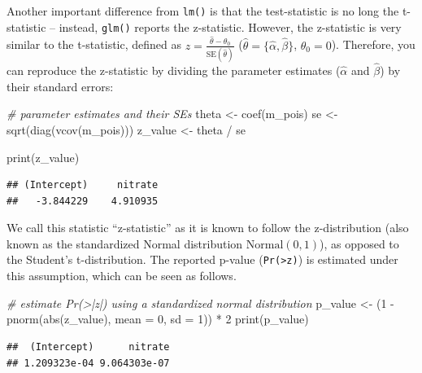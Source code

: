 \documentclass[
]{article}
\newenvironment{Shaded}{\begin{snugshade}}{\end{snugshade}}
\newcommand{\AttributeTok}[1]{\textcolor[rgb]{0.77,0.63,0.00}{#1}}
\newcommand{\CommentTok}[1]{\textcolor[rgb]{0.56,0.35,0.01}{\textit{#1}}}
\newcommand{\DecValTok}[1]{\textcolor[rgb]{0.00,0.00,0.81}{#1}}
\newcommand{\FunctionTok}[1]{\textcolor[rgb]{0.00,0.00,0.00}{#1}}
\newcommand{\NormalTok}[1]{#1}
\newcommand{\OtherTok}[1]{\textcolor[rgb]{0.56,0.35,0.01}{#1}}
\newcommand{\SpecialCharTok}[1]{\textcolor[rgb]{0.00,0.00,0.00}{#1}}
\begin{document}
Another important difference from \texttt{lm()} is that the test-statistic is no long the t-statistic -- instead, \texttt{glm()} reports the z-statistic. However, the z-statistic is very similar to the t-statistic, defined as \(z=\frac{\hat{\theta} - \theta_0}{\text{SE}(\hat{\theta})}\) (\(\hat{\theta} = \{\hat{\alpha}, \hat{\beta}\}\), \(\theta_0 = 0\)). Therefore, you can reproduce the z-statistic by dividing the parameter estimates (\(\hat{\alpha}\) and \(\hat{\beta}\)) by their standard errors:

\begin{Shaded}
\begin{Highlighting}[]
\CommentTok{\# parameter estimates and their SEs}
\NormalTok{theta }\OtherTok{\textless{}{-}} \FunctionTok{coef}\NormalTok{(m\_pois)}
\NormalTok{se }\OtherTok{\textless{}{-}} \FunctionTok{sqrt}\NormalTok{(}\FunctionTok{diag}\NormalTok{(}\FunctionTok{vcov}\NormalTok{(m\_pois)))}
\NormalTok{z\_value }\OtherTok{\textless{}{-}}\NormalTok{ theta }\SpecialCharTok{/}\NormalTok{ se}

\FunctionTok{print}\NormalTok{(z\_value)}
\end{Highlighting}
\end{Shaded}

\begin{verbatim}
## (Intercept)     nitrate 
##   -3.844229    4.910935
\end{verbatim}

We call this statistic ``z-statistic'' as it is known to follow the z-distribution (also known as the standardized Normal distribution \(\text{Normal}(0, 1)\)), as opposed to the Student's t-distribution. The reported p-value (\texttt{Pr(\textgreater{}\textbar{}z\textbar{})}) is estimated under this assumption, which can be seen as follows.

\begin{Shaded}
\begin{Highlighting}[]
\CommentTok{\# estimate Pr(\textgreater{}|z|) using a standardized normal distribution}
\NormalTok{p\_value }\OtherTok{\textless{}{-}}\NormalTok{ (}\DecValTok{1} \SpecialCharTok{{-}} \FunctionTok{pnorm}\NormalTok{(}\FunctionTok{abs}\NormalTok{(z\_value), }\AttributeTok{mean =} \DecValTok{0}\NormalTok{, }\AttributeTok{sd =} \DecValTok{1}\NormalTok{)) }\SpecialCharTok{*} \DecValTok{2}
\FunctionTok{print}\NormalTok{(p\_value)}
\end{Highlighting}
\end{Shaded}

\begin{verbatim}
##  (Intercept)      nitrate 
## 1.209323e-04 9.064303e-07
\end{verbatim}
\end{document}
